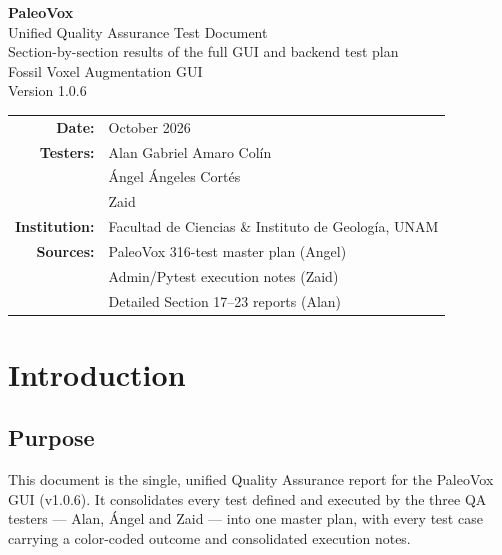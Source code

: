 \documentclass[12pt,a4paper]{article}
\begin{document}
\begin{titlepage}
\centering
\vspace*{2.5cm}

{\Huge\bfseries PaleoVox}\\[0.5cm]
{\Large Unified Quality Assurance Test Document}\\[0.3cm]
{\large Section-by-section results of the full GUI and backend test plan}\\[1.2cm]

{\large Fossil Voxel Augmentation GUI}\\[0.5cm]
{\large Version 1.0.6}\\[2cm]

\begin{tabular}{rl}
\textbf{Date:} & October 2026 \\
\textbf{Testers:} & Alan Gabriel Amaro Col\'in \\
                  & \'Angel \'Angeles Cort\'es \\
                  & Zaid \\
\textbf{Institution:} & Facultad de Ciencias \& Instituto de Geolog\'ia, UNAM \\
\textbf{Sources:} & PaleoVox 316-test master plan (Angel) \\
                  & Admin/Pytest execution notes (Zaid) \\
                  & Detailed Section 17--23 reports (Alan) \\
\end{tabular}

\vfill
\end{titlepage}

\tableofcontents
\newpage

\section{Introduction}

\subsection{Purpose}
This document is the single, unified Quality Assurance report for the PaleoVox
GUI (v1.0.6). It consolidates every test defined and executed by the three QA
testers --- Alan, \'Angel and Zaid --- into one master plan, with every test case
carrying a color-coded outcome and consolidated execution notes.
\end{document}

